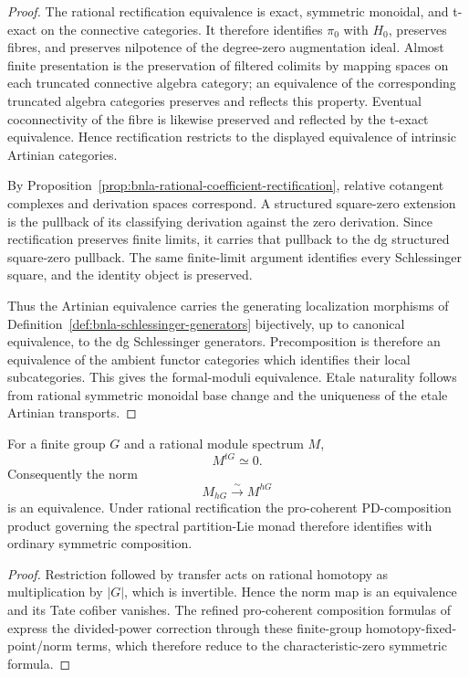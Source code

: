 \begin{proof}
The rational rectification equivalence is exact, symmetric monoidal, and
t-exact on the connective categories.  It therefore identifies $\pi_0$ with
$H_0$, preserves fibres, and preserves nilpotence of the degree-zero
augmentation ideal.  Almost finite presentation is the preservation of
filtered colimits by mapping spaces on each truncated connective algebra
category; an equivalence of the corresponding truncated algebra categories
preserves and reflects this property.  Eventual coconnectivity of the fibre
is likewise preserved and reflected by the t-exact equivalence.  Hence
rectification restricts to the displayed equivalence of intrinsic Artinian
categories.

By
Proposition~\ref{prop:bnla-rational-coefficient-rectification}, relative
cotangent complexes and derivation spaces correspond.  A structured
square-zero extension is the pullback of its classifying derivation against
the zero derivation.  Since rectification preserves finite limits, it carries
that pullback to the dg structured square-zero pullback.  The same
finite-limit argument identifies every Schlessinger square, and the identity
object is preserved.

Thus the Artinian equivalence carries the generating localization morphisms
of Definition~\ref{def:bnla-schlessinger-generators} bijectively, up to
canonical equivalence, to the dg Schlessinger generators.  Precomposition is
therefore an equivalence of the ambient functor categories which identifies
their local subcategories.  This gives the formal-moduli equivalence.
Etale naturality follows from rational symmetric monoidal base change and the
uniqueness of the etale Artinian transports.
\end{proof}


\begin{lemma}
\label{lem:bnla-rational-tate-vanishing}
For a finite group $G$ and a rational module spectrum $M$,
\[
    M^{tG}\simeq0.
\]
Consequently the norm
\[
    M_{hG}\xrightarrow{\sim}M^{hG}
\]
is an equivalence.  Under rational rectification the pro-coherent
PD-composition product governing the spectral partition-Lie monad therefore
identifies with ordinary symmetric composition.
\end{lemma}

\begin{proof}
Restriction followed by transfer acts on rational homotopy as multiplication
by $|G|$, which is invertible.  Hence the norm map is an equivalence and its
Tate cofiber vanishes.  The refined pro-coherent composition formulas of
\cite{BrantnerCamposNuiten2025} express the divided-power correction through
these finite-group homotopy-fixed-point/norm terms, which therefore reduce to
the characteristic-zero symmetric formula.
\end{proof}

